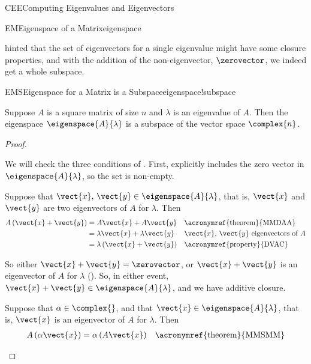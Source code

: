 \begin{subsect}{CEE}{Computing Eigenvalues and Eigenvectors}
\begin{definition}{EM}{Eigenspace of a Matrix}{eigenspace}
\end{definition}
%
\begin{para} hinted that the set of eigenvectors for a single eigenvalue might have some closure properties, and with the addition of the non-eigenvector, $\zerovector$, we indeed get a whole subspace.\end{para}
%
\begin{theorem}{EMS}{Eigenspace for a Matrix is a Subspace}{eigenspace!subspace}
\begin{para}Suppose  $A$ is a square matrix of size $n$ and $\lambda$ is an eigenvalue of $A$.  Then the eigenspace $\eigenspace{A}{\lambda}$ is a subspace of the vector space $\complex{n}$.\end{para}
\end{theorem}
%
\begin{proof}
\begin{para}We will check the three conditions of .  First,  explicitly includes the zero vector in $\eigenspace{A}{\lambda}$, so the set is non-empty.\end{para}
%
\begin{para}Suppose that $\vect{x},\,\vect{y}\in\eigenspace{A}{\lambda}$, that is, $\vect{x}$ and $\vect{y}$ are two eigenvectors of $A$ for $\lambda$.  Then
%
\begin{align*}
A\left(\vect{x}+\vect{y}\right)&=A\vect{x}+A\vect{y}&&\text{\acronymref{theorem}{MMDAA}}\\
&=\lambda\vect{x}+\lambda\vect{y}&&\text{$\vect{x},\,\vect{y}$ eigenvectors of $A$}\\
&=\lambda\left(\vect{x}+\vect{y}\right)&&\text{\acronymref{property}{DVAC}}
\end{align*}
\end{para}
%
\begin{para}So either $\vect{x}+\vect{y}=\zerovector$,  or $\vect{x}+\vect{y}$ is an eigenvector of $A$ for $\lambda$ (). So, in either event, $\vect{x}+\vect{y}\in\eigenspace{A}{\lambda}$, and we have additive closure.\end{para}
%
\begin{para}Suppose that $\alpha\in\complex{\null}$, and that $\vect{x}\in\eigenspace{A}{\lambda}$, that is, $\vect{x}$ is an eigenvector of $A$ for $\lambda$.  Then
%
\begin{align*}
A\left(\alpha\vect{x}\right)&=\alpha\left(A\vect{x}\right)&&\text{\acronymref{theorem}{MMSMM}}\\

\end{align*}
\end{para}
\end{proof}
\end{subsect}
